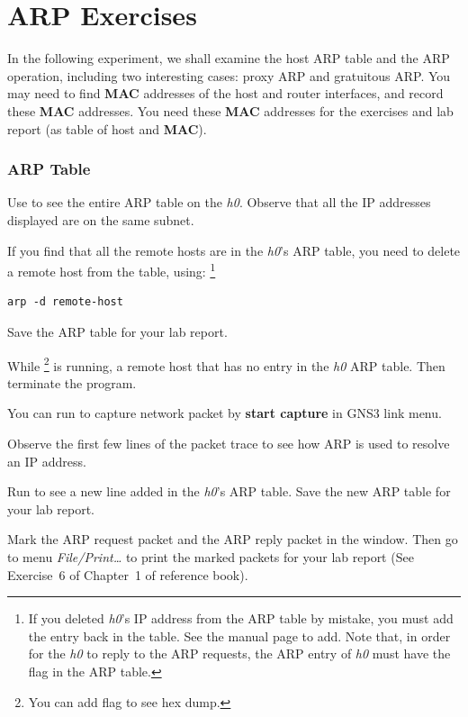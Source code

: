 \documentclass{../UTNetLab}
\begin{document}
\part{ARP Exercises}
In the following experiment, we shall examine the host ARP table and the ARP operation, including two interesting cases: proxy ARP and gratuitous ARP.
You may need to find \textbf{MAC} addresses of the host and router interfaces, and record these \textbf{MAC} addresses.
You need these \textbf{MAC} addresses for the exercises and lab report (as table of host and \textbf{MAC}).

\section{ARP Table}
Use  to see the entire ARP table on the \textit{h0}.
Observe that all the IP addresses displayed are on the same subnet.

If you find that all the remote hosts are in the \textit{h0}’s ARP table, you need to delete a remote host from the table, using:
\footnote{If you deleted \textit{h0}’s IP address from the ARP table by mistake, you must add the entry back in the table.
    See the  manual page to add.
    Note that, in order for the \textit{h0} to reply to the ARP requests, the ARP entry of \textit{h0} must have the  flag in the ARP table.}
\begin{lstlisting}[emph={remote-host}]
arp -d remote-host
    \end{lstlisting}

Save the ARP table for your lab report.

While \footnote{You can add  flag to see hex dump.} is running,  a remote host that has no entry in the \textit{h0} ARP table.
Then terminate the  program.

You can run  to capture network packet by \textbf{start capture} in GNS3 link menu.

Observe the first few lines of the packet trace to see how ARP is used to resolve an IP address.

Run  to see a new line added in the \textit{h0}’s ARP table.
Save the new ARP table for your lab report.

Mark the ARP request packet and the ARP reply packet in the  window.
Then go to menu \textit{File/Print\ldots} to print the marked packets for your lab report (See Exercise~6 of Chapter~1 of reference book).
\end{document}
